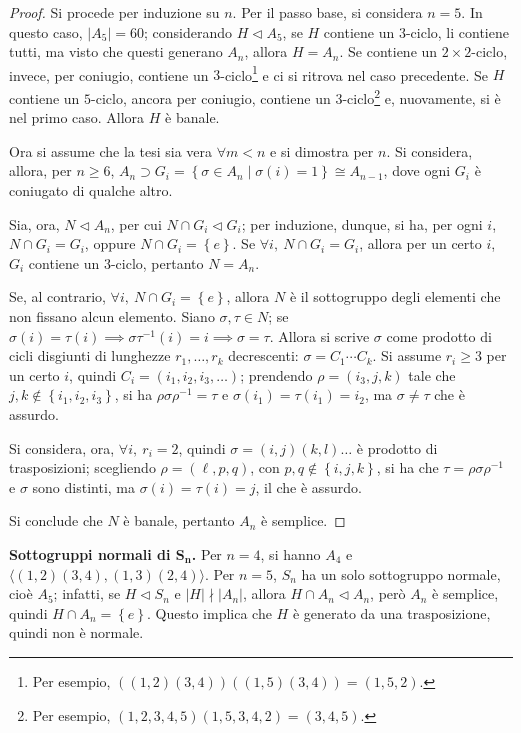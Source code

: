 \documentclass[12pt]{scrartcl}
\theoremstyle{style}
\numberwithin{equation}{subsection}
\begin{document}
	\begin{proof}
Si procede per induzione su $n$.
Per il passo base, si considera $n=5$. 
In questo caso, $\lvert A_5 \rvert =60$; considerando $H \lhd A_5$, se $H$ contiene un $3$-ciclo, li contiene tutti, ma visto che questi generano $A_n$, allora $H = A_n$.
Se contiene un $2\times 2$-ciclo, invece, per coniugio, contiene un $3$-ciclo\footnote{Per esempio, $((1,2)(3,4))((1,5)(3,4)) = (1,5,2)$.} e ci si ritrova nel caso precedente.
Se $H$ contiene un $5$-ciclo, ancora per coniugio, contiene un $3$-ciclo\footnote{Per esempio, $(1,2,3,4,5) (1,5,3,4,2) = (3,4,5)$.} e, nuovamente, si \`e nel primo caso.
Allora $H$ \`e banale.

Ora si assume che la tesi sia vera $\forall m < n$ e si dimostra per $n$.
Si considera, allora, per $n\ge 6$, $A_n \supset G_i = \left\{ \sigma \in A_n  \mid \sigma (i) = 1 \right\} \cong A_{n-1} $, dove ogni $G_i$ \`e coniugato di qualche altro.

Sia, ora, $N \lhd A_n$, per cui $N\cap G_i \lhd G_i$; per induzione, dunque, si ha, per ogni $i$, $N\cap G_i = G_i$, oppure $N\cap G_i = \left\{ e \right\} $.
Se $\forall i, \ N\cap G_i = G_i$, allora per un certo $i$, $G_i$ contiene un $3$-ciclo, pertanto $N = A_n$.

Se, al contrario, $\forall i,\ N\cap G_i = \left\{ e \right\} $, allora $N$ \`e il sottogruppo degli elementi che non fissano alcun elemento.
Siano $\sigma , \tau  \in N$; se $\sigma (i) = \tau  (i) \implies \sigma \tau ^{-1}(i) = i\implies \sigma =\tau $.
Allora si scrive $\sigma $ come prodotto di cicli disgiunti di lunghezze $r_1,\ldots,r_k$ decrescenti: $\sigma  = C_1\cdots C_k$.
Si assume $r_i \ge 3$ per un certo $i$, quindi $C_i= (i_1,i_2,i_3,\ldots)$; prendendo $\rho =(i_3,j,k)$ tale che $j,k \not \in \left\{ i_1,i_2,i_3 \right\} $, si ha $\rho \sigma \rho ^{-1}= \tau $ e $\sigma (i_1) = \tau (i_1)= i_2$, ma $\sigma \neq \tau $ che \`e assurdo.

Si considera, ora, $\forall i, \ r_i=2$, quindi $\sigma = (i,j)(k,l)\ldots$ \`e prodotto di trasposizioni; scegliendo $\rho =(\ell ,p,q)$, con $p,q \not \in \left\{ i,j,k \right\} $, si ha che $\tau  = \rho \sigma \rho ^{-1}$ e $\sigma $ sono distinti, ma $\sigma (i) = \tau (i) = j$, il che \`e assurdo.

Si conclude che $N$ \`e banale, pertanto $A_n$ \`e semplice.
	\end{proof}

\textbf{Sottogruppi normali di $\mathbf{S_n} $.} Per $n=4$, si hanno $A_4$ e $\langle (1,2)(3,4),(1,3)(2,4) \rangle$.
Per $n=5$, $S_n$ ha un solo sottogruppo normale, cio\`e $A_5$; infatti, se $H\lhd S_n$ e $|H|\nmid |A_n|$, allora $H\cap A_n \lhd A_n$, per\`o $A_n$ \`e semplice, quindi $H\cap A_n = \left\{ e \right\} $.
Questo implica che $H$ \`e generato da una trasposizione, quindi non \`e normale.
\end{document}
